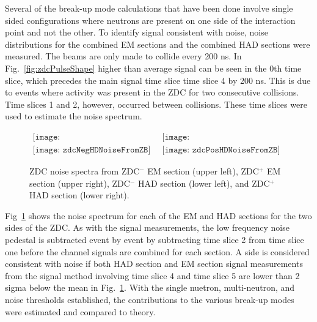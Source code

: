       Several of the break-up mode calculations that have been done involve
        single sided configurations where neutrons are present on one side
        of the interaction point and not the other.
      To identify signal consistent with noise, noise distributions for the 
        combined EM sections and the combined HAD sections were measured.
      The beams are only made to collide every 200 ns. 
      In Fig.~\ref{fig:zdcPulseShape} higher than average signal can be seen
        in the 0th time slice, which precedes the main signal time slice 
        time slice 4 by 200 ns. 
      This is due to events where activity was present in the ZDC for 
        two consecutive collisions.
      Time slices 1 and 2, however, occurred between collisions.
      These time slices were used to estimate the noise spectrum.
      \begin{figure}[!Hhbt]
        \centering
        $ \begin{array}{cc}
          \texttt{[image: zdcNegEMNoiseFromZBNoCor]} & 
          \texttt{[image: zdcPosEMNoiseFromZBNoCor]} \\
          \texttt{[image: zdcNegHDNoiseFromZB]} &
          \texttt{[image: zdcPosHDNoiseFromZB]}
        \end{array} $
        \caption{ZDC noise spectra from ZDC$^{-}$ EM section (upper left), 
          ZDC$^{+}$ EM section (upper right), ZDC$^{-}$ HAD section (lower left), 
          and ZDC$^{+}$ HAD section (lower right).}
        \label{fig:zdcNoiseSpectra}
      \end{figure}

      Fig~\ref{fig:zdcNoiseSpectra} shows the noise spectrum for each of the 
        EM and HAD sections for the two sides of the ZDC. 
      As with the signal measurements, the low frequency noise pedestal is 
        subtracted event by event by subtracting time slice 2 from time slice
        one before the channel signals are combined for each section.
      A side is considered consistent with noise if both HAD section and EM 
        section signal measurements from the signal method involving time slice
        4 and time slice 5 are lower than 2 sigma below the mean in 
        Fig.~\ref{fig:zdcNoiseSpectra}.
      With the single nuetron, multi-neutron, and noise thresholds established,
        the contributions to the various break-up modes were estimated and 
        compared to theory. 

